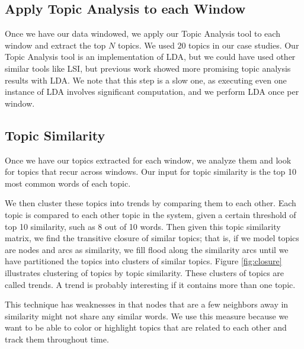 \documentclass[times, 10pt,twocolumn]{article}
\newcommand{\shrinkit}{\vspace*{-.3em}}
\begin{document}
\shrinkit
\subsection{Apply Topic Analysis to each Window}
\shrinkit

Once we have our data windowed, we apply our Topic Analysis tool to
each window and extract the top $N$ topics. We used $20$
topics in our case studies. Our Topic Analysis tool is an
implementation of LDA, but we could have used other similar tools like
LSI, but previous work showed more promising topic analysis results
with LDA.  We note that this step is a slow one, as executing even one
instance of LDA involves significant computation, and we perform LDA
once per window.





\shrinkit
\subsection{Topic Similarity}
\shrinkit


Once we have our topics extracted for each window, we analyze them and
look for topics that recur across windows. Our input for topic
similarity is the top 10 most common words of each topic.

We then cluster these topics into trends by comparing them to each
other.  Each topic is compared to each other topic in the system,
given a certain threshold of top 10 similarity, such as 8 out of 10
words. Then given this topic similarity matrix, we find the transitive
closure of similar topics; that is, if we model topics are nodes and
arcs as similarity, we fill flood along the similarity arcs until we
have partitioned the topics into clusters of similar topics. Figure
\ref{fig:closure} illustrates clustering of topics by 
topic similarity. These clusters of topics are called trends. A trend
is probably interesting if it contains more than one topic.

This technique has weaknesses in that nodes that are a few neighbors
away in similarity might not share any similar words.  We use this measure
because we want to be able to color or highlight topics that are
related to each other and track them throughout time.
\end{document}
